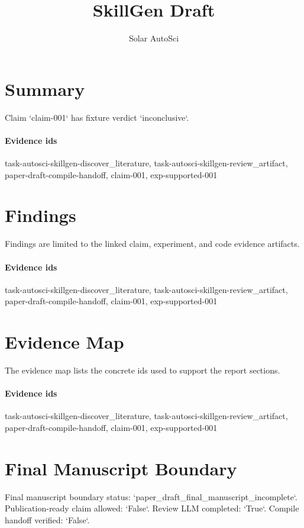 \documentclass{article}
\title{SkillGen Draft}
\author{Solar AutoSci}
\date{}
\begin{document}
\maketitle

\section{Summary}
Claim `claim-001` has fixture verdict `inconclusive`.

\paragraph{Evidence ids} task-autosci-skillgen-discover\_literature, task-autosci-skillgen-review\_artifact, paper-draft-compile-handoff, claim-001, exp-supported-001

\section{Findings}
Findings are limited to the linked claim, experiment, and code evidence artifacts.

\paragraph{Evidence ids} task-autosci-skillgen-discover\_literature, task-autosci-skillgen-review\_artifact, paper-draft-compile-handoff, claim-001, exp-supported-001

\section{Evidence Map}
The evidence map lists the concrete ids used to support the report sections.

\paragraph{Evidence ids} task-autosci-skillgen-discover\_literature, task-autosci-skillgen-review\_artifact, paper-draft-compile-handoff, claim-001, exp-supported-001

\section{Final Manuscript Boundary}
Final manuscript boundary status: `paper\_draft\_final\_manuscript\_incomplete`. Publication-ready claim allowed: `False`. Review LLM completed: `True`. Compile handoff verified: `False`.
\end{document}

